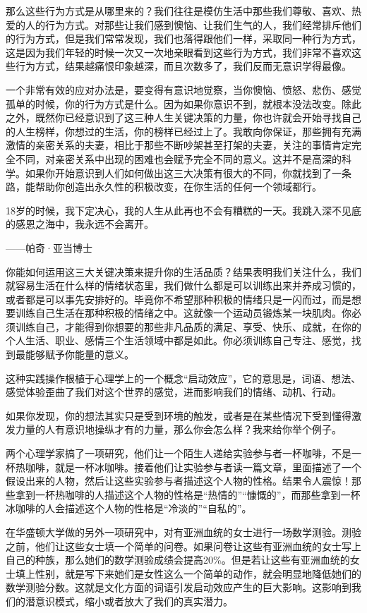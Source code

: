 那么这些行为方式是从哪里来的？我们往往是模仿生活中那些我们尊敬、喜欢、热爱的人的行为方式。对那些让我们感到懊恼、让我们生气的人，我们经常排斥他们的行为方式，但是我们常常发现，我们也落得跟他们一样，采取同一种行为方式，这是因为我们年轻的时候一次又一次地亲眼看到这些行为方式，我们非常不喜欢这些行为方式，结果越痛恨印象越深，而且次数多了，我们反而无意识学得最像。

一个非常有效的应对办法是，要变得有意识地觉察，当你懊恼、愤怒、悲伤、感觉孤单的时候，你的行为方式是什么。因为如果你意识不到，就根本没法改变。除此之外，既然你已经意识到了这三种人生关键决策的力量，你也许就会开始寻找自己的人生榜样，你想过的生活，你的榜样已经过上了。我敢向你保证，那些拥有充满激情的亲密关系的夫妻，相比于那些不断吵架甚至打架的夫妻，关注的事情肯定完全不同，对亲密关系中出现的困难也会赋予完全不同的意义。这并不是高深的科学。如果你开始意识到人们如何做出这三大决策有很大的不同，你就找到了一条路，能帮助你创造出永久性的积极改变，在你生活的任何一个领域都行。

\begin{BookQuote}
18岁的时候，我下定决心，我的人生从此再也不会有糟糕的一天。我跳入深不见底的感恩之海中，我永远不会离开。

\hfill ——帕奇·亚当博士
\end{BookQuote}

你能如何运用这三大关键决策来提升你的生活品质？结果表明我们关注什么，我们就容易生活在什么样的情绪状态里，我们做什么都是可以训练出来并养成习惯的，或者都是可以事先安排好的。毕竟你不希望那种积极的情绪只是一闪而过，而是想要训练自己生活在那种积极的情绪之中。这就像一个运动员锻炼某一块肌肉。你必须训练自己，才能得到你想要的那些非凡品质的满足、享受、快乐、成就，在你的个人生活、职业、感情三个生活领域中都是如此。你必须训练自己专注、感觉，找到最能够赋予你能量的意义。

这种实践操作根植于心理学上的一个概念“启动效应”，它的意思是，词语、想法、感觉体验歪曲了我们对这个世界的感觉，进而影响我们的情绪、动机、行动。

如果你发现，你的想法其实只是受到环境的触发，或者是在某些情况下受到懂得激发力量的人有意识地操纵才有的力量，那么你会怎么样？我来给你举个例子。

两个心理学家搞了一项研究，他们让一个陌生人递给实验参与者一杯咖啡，不是一杯热咖啡，就是一杯冰咖啡。接着他们让实验参与者读一篇文章，里面描述了一个假设出来的人物，然后让这些实验参与者描述这个人物的性格。结果令人震惊！那些拿到一杯热咖啡的人描述这个人物的性格是“热情的”“慷慨的”，而那些拿到一杯冰咖啡的人会描述这个人物的性格是“冷淡的”“自私的”。

在华盛顿大学做的另外一项研究中，对有亚洲血统的女士进行一场数学测验。测验之前，他们让这些女士填一个简单的问卷。如果问卷让这些有亚洲血统的女士写上自己的种族，那么她们的数学测验成绩会提高20\%。但是若让这些有亚洲血统的女士填上性别，就是写下来她们是女性这么一个简单的动作，就会明显地降低她们的数学测验分数。这就是文化方面的词语引发启动效应产生的巨大影响。这影响到我们的潜意识模式，缩小或者放大了我们的真实潜力。

